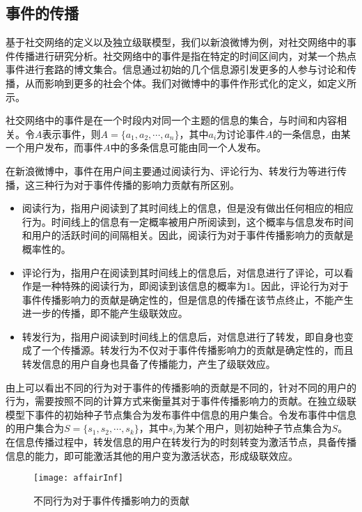 \subsection{事件的传播}
\label{subsec5:affair}
基于社交网络的定义以及独立级联模型，我们以新浪微博为例，对社交网络中的事件传播进行研究分析。社交网络中的事件是指在特定的时间区间内，对某一个热点事件进行套路的博文集合。信息通过初始的几个信息源引发更多的人参与讨论和传播，从而影响到更多的社会个体。我们对微博中的事件作形式化的定义，如定义所示。

\begin{defn}[事件]
\label{def:event}
社交网络中的事件是在一个时段内对同一个主题的信息的集合，与时间和内容相关。令$A$表示事件，则$A=\{a_1, a_2, \cdots, a_n\}$，其中$a_i$为讨论事件$A$的一条信息，由某一个用户发布，而事件$A$中的多条信息可能由同一个人发布。
\end{defn}

在新浪微博中，事件在用户间主要通过阅读行为、评论行为、转发行为等进行传播，这三种行为对于事件传播的影响力贡献有所区别。
\begin{itemize}
  \item 阅读行为，指用户阅读到了其时间线上的信息，但是没有做出任何相应的相应行为。时间线上的信息有一定概率被用户所阅读到，这个概率与信息发布时间和用户的活跃时间的间隔相关。因此，阅读行为对于事件传播影响力的贡献是概率性的。
  \item 评论行为，指用户在阅读到其时间线上的信息后，对信息进行了评论，可以看作是一种特殊的阅读行为，即阅读到该信息的概率为1。因此，评论行为对于事件传播影响力的贡献是确定性的，但是信息的传播在该节点终止，不能产生进一步的传播，即不能产生级联效应。
  \item 转发行为，指用户阅读到时间线上的信息后，对信息进行了转发，即自身也变成了一个传播源。转发行为不仅对于事件传播影响力的贡献是确定性的，而且转发信息的用户自身也具备了传播能力，产生了级联效应。
\end{itemize}

由上可以看出不同的行为对于事件的传播影响的贡献是不同的，针对不同的用户的行为，需要按照不同的计算方式来衡量其对于事件传播影响力的贡献。在独立级联模型下事件的初始种子节点集合为发布事件中信息的用户集合。令发布事件中信息的用户集合为$S=\{s_1,s_2,\cdots,s_k\}$，其中$s_i$为某个用户，则初始种子节点集合为$S$。在信息传播过程中，转发信息的用户在转发行为的时刻转变为激活节点，具备传播信息的能力，即可能激活其他的用户变为激活状态，形成级联效应。

\begin{figure}[!ht]
    \centering
    \texttt{[image: affairInf]}
    \caption{不同行为对于事件传播影响力的贡献}
    \label{fig:affairInf}
\end{figure}

